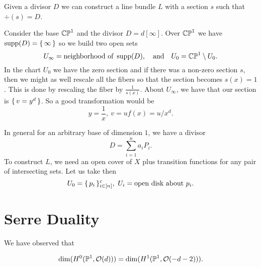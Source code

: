\documentclass[12pt]{memoir}
\begin{document}
Given a divisor $D$ we can construct a line bundle $L$ with a section $s$ such that $\div(s)=D$. 

\begin{Ex}
Consider the base $\mathbb{CP}^1$ and the divisor $D=d[\infty]$. Over $\mathbb{CP}^1$ we have $\operatorname{supp}(D)=\{\,\infty\,\}$ so we build two open sets
$$U_\infty=\text{neighborhood of }\operatorname{supp}(D),\quad\text{and}\quad U_0=\mathbb{CP}^1\setminus U_0.$$
In the chart $U_0$ we have the zero section and if there was a non-zero section $s$, then we might as well rescale all the fibers so that the section becomes $s(x)=1$. This is done by rescaling the fiber by $\frac{1}{s(x)}$. About $U_\infty$, we have that our section is $\{\,v=y^d\,\}$. So a good transformation would be 
$$y=\frac{1}{x},\ v=uf(x)=u/x^d.$$
\end{Ex}

In general for an arbitrary base of dimension $1$, we have a divisor 
$$D=\sum_{i=1}^n a_iP_i.$$
To construct $L$, we need an open cover of $X$ plus transition functions for any pair of intersecting sets. Let us take then 
$$U_0=\set{p_i}_{i\in\bonj{n}}^c,\ U_i=\text{open disk about }p_i.$$


\section{Serre Duality}

We have observed that 

$$\dim(H^0(\mathbb{P}^1,\mathcal{O}(d)))=\dim(H^1(\mathbb{P}^1,\mathcal{O}(-d-2))).$$
\end{document}
